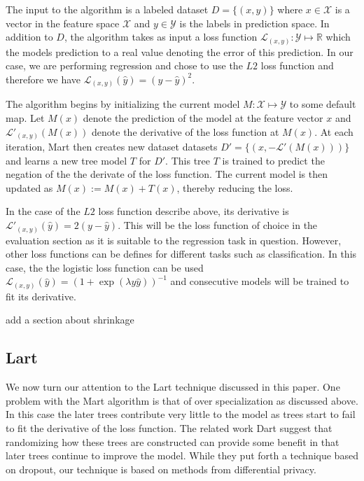 \documentclass{article} %
\begin{document}
The input to the algorithm is a labeled dataset $D=\{(x,y)\}$ where $x\in \mathcal{X}$ is a vector in the feature space $\mathcal{X}$ and $y\in \mathcal{Y}$ is the labels in prediction space. In addition to $D$, the algorithm takes as input a loss function $\mathcal{L}_{(x,y)} :  \mathcal{Y} \mapsto \mathds{R} $ which the models prediction to a real value denoting the error of this prediction. In our case, we are performing regression and chose to use the $L2$ loss function and therefore we have $\mathcal{L}_{(x,y)}(\hat{y} ) = (y- \hat{y})^2$.
 
 
The algorithm begins by initializing the current model $M:\mathcal{X}\mapsto \mathcal{Y}$ to some default map. Let $M(x)$ denote the prediction of the model at the feature vector $x$ and $\mathcal{L}'_{(x,y)}(M(x))$ denote the derivative of the loss function at $M(x)$. At each iteration, Mart then creates new dataset datasets $D'=\{(x,-\mathcal{L}'(M(x)))\}$  and learns a new tree model $T$ for $D'$. This tree $T$ is trained to predict the negation of the the derivate of the loss function. The current model is then updated as $M(x):= M(x) + T(x)$, thereby reducing the loss.

In the case of the $L2$ loss function describe above, its derivative is $\mathcal{L}'_{(x,y)}(\hat{y}) = 2(y - \hat{y})$. This will be the loss function of choice in the evaluation section as it is suitable to the regression task in question. However, other loss functions can be defines for different tasks such as classification. In this case, the  the logistic loss function can be used $\mathcal{L}_{(x,y)} (\hat{y}) =( 1 + \exp(\lambda y \hat{y}))^{-1}$ and consecutive models will be trained to fit its derivative.

{\color{red} add a section about shrinkage}


\subsection{Lart}
We now turn our attention to the Lart technique discussed in this paper. One problem with the Mart algorithm is that of over specialization as discussed above\cite{dart}. In this case the later trees contribute very little to the  model as trees start to fail to fit the derivative of the loss function. The related work Dart \cite{dart} suggest that randomizing how these trees are constructed can provide some benefit in that later trees continue to improve the model. While they put forth a technique based on dropout, our technique is based on methods from differential privacy.
\end{document}
